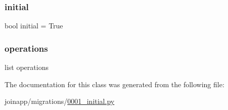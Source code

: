 \subsubsection{\texorpdfstring{initial}{initial}}
{\footnotesize\ttfamily bool initial = True\hspace{0.3cm}{\ttfamily [static]}}

\mbox{\label{classjoinapp_1_1migrations_1_10001__initial_1_1_migration_a33f24b85692683d7286389f0224a3d13}} 
\subsubsection{\texorpdfstring{operations}{operations}}
{\footnotesize\ttfamily list operations\hspace{0.3cm}{\ttfamily [static]}}



The documentation for this class was generated from the following file\+:\begin{DoxyCompactItemize}
\item 
joinapp/migrations/\mbox{\hyperlink{0001__initial_8py}{0001\+\_\+initial.\+py}}\end{DoxyCompactItemize}

